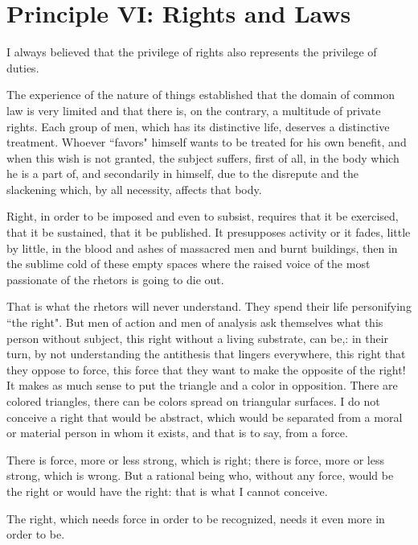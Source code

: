 \section{Principle VI: Rights and Laws}

I always believed that the privilege of rights also represents the privilege of duties.

The experience of the nature of things established that the domain of common law is very limited and that there is, on the contrary, a multitude of private rights. Each group of men, which has its distinctive life, deserves a distinctive treatment. Whoever ``favors" himself wants to be treated for his own benefit, and when this wish is not granted, the subject suffers, first of all, in the body which he is a part of, and secondarily in himself, due to the disrepute and the slackening which, by all necessity, affects that body.

Right, in order to be imposed and even to subsist, requires that it be exercised, that it be sustained, that it be published. It presupposes activity or it fades, little by little, in the blood and ashes of massacred men and burnt buildings, then in the sublime cold of these empty spaces where the raised voice of the most passionate of the rhetors is going to die out.

That is what the rhetors will never understand. They spend their life personifying ``the right". But men of action and men of analysis ask themselves what this person without subject, this right without a living substrate, can be,: in their turn, by not understanding the antithesis that lingers everywhere, this right that they oppose to force, this force that they want to make the opposite of the right! It makes as much sense to put the triangle and a color in opposition. There are colored triangles, there can be colors spread on triangular surfaces. I do not conceive a right that would be abstract, which would be separated from a moral or material person in whom it exists, and that is to say, from a force.

There is force, more or less strong, which is right; there is force, more or less strong, which is wrong. But a rational being who, without any force, would be the right or would have the right: that is what I cannot conceive.

The right, which needs force in order to be recognized, needs it even more in order to be.

